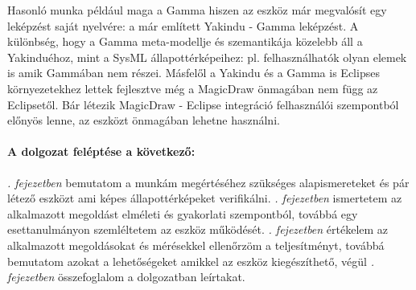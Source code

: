 Hasonló munka például maga a Gamma hiszen az eszköz már megvalósít egy leképzést saját nyelvére: a már említett Yakindu - Gamma leképzést. A különbség, hogy a Gamma meta-modellje és szemantikája közelebb áll a Yakinduéhoz, mint a SysML állapottérképeihez: pl. felhasználhatók olyan elemek is amik Gammában nem részei. Másfelől a Yakindu és a Gamma is Eclipses környezetekhez lettek fejlesztve még a MagicDraw önmagában nem függ az Eclipsetől. Bár létezik MagicDraw - Eclipse integráció felhasználói szempontból előnyös lenne, az eszközt önmagában lehetne használni.

\paragraph{A dolgozat feléptése a következő:} \emph{. fejezetben} bemutatom a munkám megértéséhez szükséges alapismereteket és pár létező eszközt ami képes állapottérképeket verifikálni. \emph{. fejezetben} ismertetem az alkalmazott megoldást elméleti és gyakorlati szempontból, továbbá egy esettanulmányon szemléltetem az eszköz működését. \emph{. fejezetben} értékelem az alkalmazott megoldásokat és mérésekkel ellenőrzöm a teljesítményt, továbbá bemutatom azokat a lehetőségeket amikkel az eszköz kiegészíthető, végül \emph{. fejezetben} összefoglalom a dolgozatban leírtakat.

